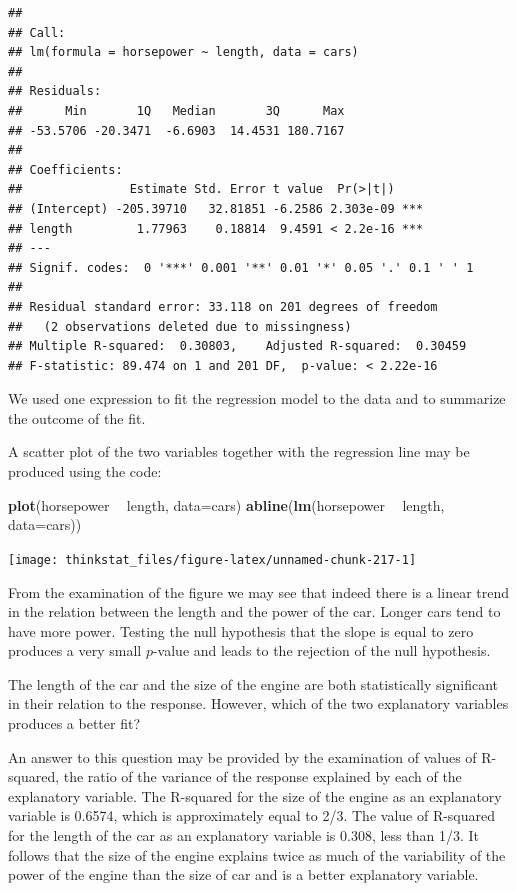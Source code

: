 \documentclass[]{krantz}
\makeatletter
\newenvironment{Shaded}{\begin{snugshade}}{\end{snugshade}}
\newcommand{\KeywordTok}[1]{\textcolor[rgb]{0.13,0.29,0.53}{\textbf{#1}}}
\newcommand{\DataTypeTok}[1]{\textcolor[rgb]{0.13,0.29,0.53}{#1}}
\newcommand{\StringTok}[1]{\textcolor[rgb]{0.31,0.60,0.02}{#1}}
\newcommand{\OperatorTok}[1]{\textcolor[rgb]{0.81,0.36,0.00}{\textbf{#1}}}
\newcommand{\NormalTok}[1]{#1}
\newenvironment{kframe}{%
\medskip{}
\setlength{\fboxsep}{.8em}
 \def\at@end@of@kframe{}%
 \ifinner\ifhmode%
  \def\at@end@of@kframe{\end{minipage}}%
  \begin{minipage}{\columnwidth}%
 \fi\fi%
 \def\FrameCommand##1{\hskip\@totalleftmargin \hskip-\fboxsep
 \colorbox{shadecolor}{##1}\hskip-\fboxsep
     \hskip-\linewidth \hskip-\@totalleftmargin \hskip\columnwidth}%
 \MakeFramed {\advance\hsize-\width
   \@totalleftmargin\z@ \linewidth\hsize
   \@setminipage}}%
 {\par\unskip\endMakeFramed%
 \at@end@of@kframe}
\renewenvironment{Shaded}{\begin{kframe}}{\end{kframe}}
\theoremstyle{definition}
\theoremstyle{definition}
\theoremstyle{definition}
\theoremstyle{remark}
\makeatother
\begin{document}
\begin{verbatim}
## 
## Call:
## lm(formula = horsepower ~ length, data = cars)
## 
## Residuals:
##      Min       1Q   Median       3Q      Max 
## -53.5706 -20.3471  -6.6903  14.4531 180.7167 
## 
## Coefficients:
##               Estimate Std. Error t value  Pr(>|t|)    
## (Intercept) -205.39710   32.81851 -6.2586 2.303e-09 ***
## length         1.77963    0.18814  9.4591 < 2.2e-16 ***
## ---
## Signif. codes:  0 '***' 0.001 '**' 0.01 '*' 0.05 '.' 0.1 ' ' 1
## 
## Residual standard error: 33.118 on 201 degrees of freedom
##   (2 observations deleted due to missingness)
## Multiple R-squared:  0.30803,    Adjusted R-squared:  0.30459 
## F-statistic: 89.474 on 1 and 201 DF,  p-value: < 2.22e-16
\end{verbatim}

We used one expression to fit the regression model to the data and to
summarize the outcome of the fit.

A scatter plot of the two variables together with the regression line
may be produced using the code:

\begin{Shaded}
\begin{Highlighting}[]
\KeywordTok{plot}\NormalTok{(horsepower }\OperatorTok{~}\StringTok{ }\NormalTok{length, }\DataTypeTok{data=}\NormalTok{cars)}
\KeywordTok{abline}\NormalTok{(}\KeywordTok{lm}\NormalTok{(horsepower }\OperatorTok{~}\StringTok{ }\NormalTok{length, }\DataTypeTok{data=}\NormalTok{cars))}
\end{Highlighting}
\end{Shaded}

\begin{center}\texttt{[image: thinkstat\_files/figure-latex/unnamed-chunk-217-1]} \end{center}

From the examination of the figure we may see that indeed there is a
linear trend in the relation between the length and the power of the
car. Longer cars tend to have more power. Testing the null hypothesis
that the slope is equal to zero produces a very small \(p\)-value and
leads to the rejection of the null hypothesis.

The length of the car and the size of the engine are both statistically
significant in their relation to the response. However, which of the two
explanatory variables produces a better fit?

An answer to this question may be provided by the examination of values
of R-squared, the ratio of the variance of the response explained by
each of the explanatory variable. The R-squared for the size of the
engine as an explanatory variable is 0.6574, which is approximately
equal to 2/3. The value of R-squared for the length of the car as an
explanatory variable is 0.308, less than 1/3. It follows that the size
of the engine explains twice as much of the variability of the power of
the engine than the size of car and is a better explanatory variable.
\end{document}
